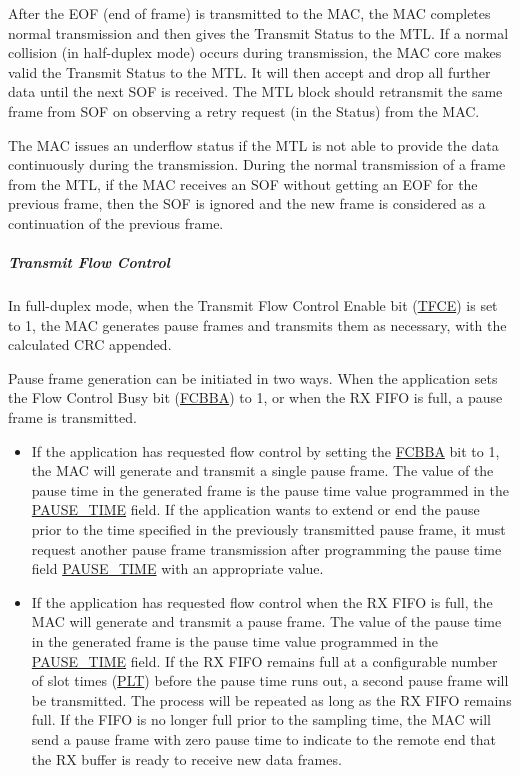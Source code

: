 \documentclass[main\_\_EN.tex]{subfiles}
\begin{document}
After the EOF (end of frame) is transmitted to the MAC, the MAC completes normal transmission and then gives the Transmit Status to the MTL. If a normal collision (in half-duplex mode) occurs during transmission, the MAC core makes valid the Transmit Status to the MTL. It will then accept and drop all further data until the next SOF is received. The MTL block should retransmit the same frame from SOF on observing a retry request (in the Status) from the MAC.

The MAC issues an underflow status if the MTL is not able to provide the data continuously during the transmission. During the normal transmission of a frame from the MTL, if the MAC receives an SOF without getting an EOF for the previous frame, then the SOF is ignored and the new frame is considered as a continuation of the previous frame.

\subparagraph{Transmit Flow Control}
In full-duplex mode, when the Transmit Flow Control Enable bit (\hyperref[regdesc:EMACFLOWCONTROLREG]{TFCE}) is set to 1, the MAC generates pause frames and transmits them as necessary, with the calculated CRC appended.

Pause frame generation can be initiated in two ways. When the application sets the Flow Control Busy bit (\hyperref[regdesc:EMACFLOWCONTROLREG]{FCBBA}) to 1, or when the RX FIFO is full, a pause frame is transmitted.

\begin{itemize}
    \item If the application has requested flow control by setting the \hyperref[regdesc:EMACFLOWCONTROLREG]{FCBBA} bit to 1, the MAC will generate and transmit a single pause frame. The value of the pause time in the generated frame is the pause time value programmed in the \hyperref[regdesc:EMACFLOWCONTROLREG]{PAUSE\_TIME} field. If the application wants to extend or end the pause prior to the time specified in the previously transmitted pause frame, it must request another pause frame transmission after programming the pause time field \hyperref[regdesc:EMACFLOWCONTROLREG]{PAUSE\_TIME} with an appropriate value.
    \item If the application has requested flow control when the RX FIFO is full, the MAC will generate and transmit a pause frame. The value of the pause time in the generated frame is the pause time value programmed in the \hyperref[regdesc:EMACFLOWCONTROLREG]{PAUSE\_TIME} field. If the RX FIFO remains full at a configurable number of slot times (\hyperref[regdesc:EMACFLOWCONTROLREG]{PLT}) before the pause time runs out, a second pause frame will be transmitted. The process will be repeated as long as the RX FIFO remains full. If the FIFO is no longer full prior to the sampling time, the MAC will send a pause frame with zero pause time to indicate to the remote end that the RX buffer is ready to receive new data frames.
\end{itemize}
\end{document}
